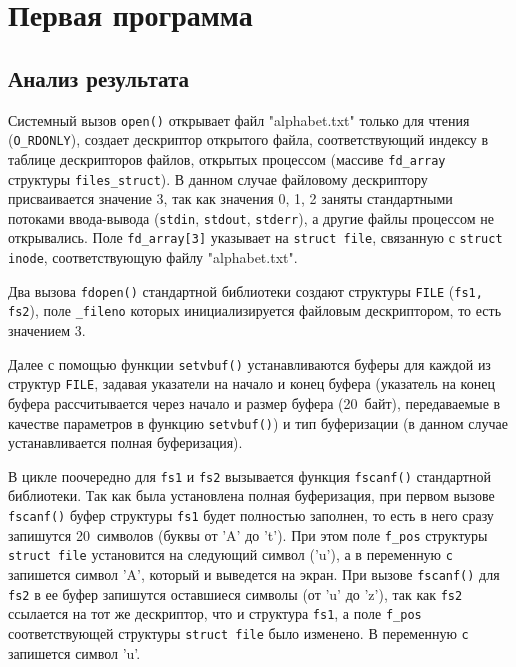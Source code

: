 \chapter{Первая программа}

\vspace{-0.5cm}


\clearpage
{}


\vspace{-0.7cm}
\section*{Анализ результата}
\vspace{-0.2cm}

Системный вызов \texttt{open()} открывает файл "alphabet.txt" только для чтения
(\texttt{O\_RDONLY}), создает дескриптор открытого файла, соответствующий
индексу в таблице дескрипторов файлов, открытых процессом (массиве
\texttt{fd\_array } структуры \texttt{files\_struct}).  В данном случае
файловому дескриптору присваивается значение 3, так как значения 0, 1, 2 заняты
стандартными потоками ввода-вывода (\texttt{stdin}, \texttt{stdout},
\texttt{stderr}), а другие файлы процессом не открывались. Поле
\texttt{fd\_array[3]} указывает на \texttt{struct file}, связанную с
\texttt{struct inode}, соответствующую файлу "alphabet.txt".

Два вызова \texttt{fdopen()} стандартной библиотеки создают структуры
\texttt{FILE} (\texttt{fs1, fs2}), поле \texttt{\_fileno} которых
инициализируется файловым дескриптором, то есть значением 3.

Далее с помощью функции \texttt{setvbuf()} устанавливаются буферы для каждой из
структур \texttt{FILE}, задавая указатели на начало и конец буфера (указатель на
конец буфера рассчитывается через начало и размер буфера (20~байт), передаваемые
в качестве параметров в функцию \texttt{setvbuf()}) и тип буферизации (в данном
случае устанавливается полная буферизация).

В цикле поочередно для \texttt{fs1} и \texttt{fs2} вызывается функция
\texttt{fscanf()} стандартной библиотеки. Так как была установлена полная
буферизация, при первом вызове \texttt{fscanf()} буфер структуры \texttt{fs1}
будет полностью заполнен, то есть в него сразу запишутся 20~символов (буквы от
'A' до 't'). При этом поле \texttt{f\_pos} структуры \texttt{struct file}
установится на следующий символ ('u'), а в переменную \texttt{c} запишется
символ 'A', который и выведется на экран. При вызове \texttt{fscanf()} для
\texttt{fs2} в ее буфер запишутся оставшиеся символы (от 'u' до 'z'), так как
\texttt{fs2} ссылается на тот же дескриптор, что и структура \texttt{fs1}, а
поле \texttt{f\_pos} соответствующей структуры \texttt{struct file} было
изменено. В переменную \texttt{c} запишется символ 'u'.

